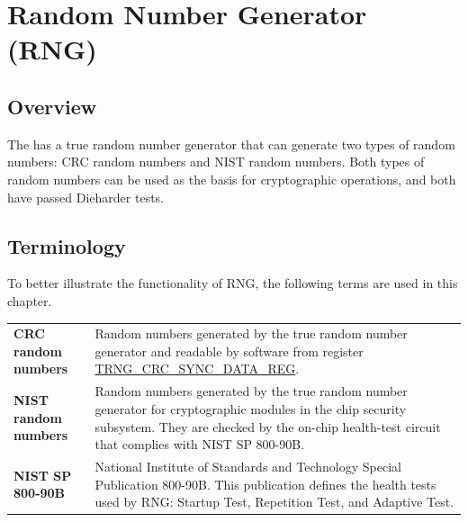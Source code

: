 \documentclass[main\_\_EN.tex]{subfiles}
\begin{document}

\ifglobal
\else
    {\let\clearpage\relax \listoftodos}
    {\let\clearpage\relax \listofdonetodos}
    \tableofcontents
\fi



\hypertarget{rng}{}
\chapter{Random Number Generator (RNG)}
\label{mod:rng}


\section{Overview}\label{sec:rng-overview}

The \chipname{} has a true random number generator that can generate two types of random numbers: CRC random numbers and NIST random numbers. Both types of random numbers can be used as the basis for cryptographic operations, and both have passed Dieharder tests.


\section{Terminology}
\label{sec:rng-term}

To better illustrate the functionality of RNG, the following terms are used in this chapter.

\begin{longtable}[c]{ R{4.5cm} p{11.5cm} }
    \textbf{CRC random numbers} & Random numbers generated by the true random number generator and readable by software from register \hyperref[regdesc:TRNGCRCSYNCDATAREG]{TRNG\_CRC\_SYNC\_DATA\_REG}.\\
    \textbf{NIST random numbers} & Random numbers generated by the true random number generator for cryptographic modules in the chip security subsystem. They are checked by the on-chip health-test circuit that complies with NIST SP 800-90B.\\
    \textbf{NIST SP 800-90B} & National Institute of Standards and Technology Special Publication 800-90B. This publication defines the health tests used by RNG: Startup Test, Repetition Test, and Adaptive Test.\\
\end{longtable}
\end{document}
